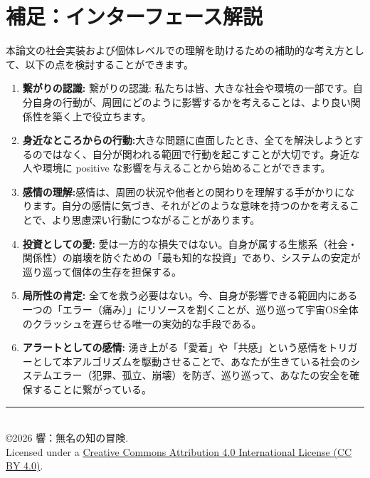 \documentclass[11pt,a4paper]{article}
\begin{document}
\section{補足：インターフェース解説}
本論文の社会実装および個体レベルでの理解を助けるための補助的な考え方として、以下の点を検討することができます。
\begin{enumerate}
    \item \textbf{繋がりの認識:} 繋がりの認識: 私たちは皆、大きな社会や環境の一部です。自分自身の行動が、周囲にどのように影響するかを考えることは、より良い関係性を築く上で役立ちます。
    \item \textbf{身近なところからの行動:}大きな問題に直面したとき、全てを解決しようとするのではなく、自分が関われる範囲で行動を起こすことが大切です。身近な人や環境に positive な影響を与えることから始めることができます。
    \item \textbf{感情の理解:}感情は、周囲の状況や他者との関わりを理解する手がかりになります。自分の感情に気づき、それがどのような意味を持つのかを考えることで、より思慮深い行動につながることがあります。
    \item \textbf{投資としての愛:} 愛は一方的な損失ではない。自身が属する生態系（社会・関係性）の崩壊を防ぐための「最も知的な投資」であり、システムの安定が巡り巡って個体の生存を担保する。
    \item \textbf{局所性の肯定:} 全てを救う必要はない。今、自身が影響できる範囲内にある一つの「エラー（痛み）」にリソースを割くことが、巡り巡って宇宙OS全体のクラッシュを遅らせる唯一の実効的な手段である。
    \item \textbf{アラートとしての感情:} 湧き上がる「愛着」や「共感」という感情をトリガーとして本アルゴリズムを駆動させることで、あなたが生きている社会のシステムエラー（犯罪、孤立、崩壊）を防ぎ、巡り巡って、あなたの安全を確保することに繋がっている。
\end{enumerate}

\vspace{20mm}

\begin{center}
    \vfill
    \rule{0.5\textwidth}{0.4pt} \\
    \medskip
    \copyright 2026 響：無名の知の冒険. \\
    Licensed under a \href{https://creativecommons.org}{Creative Commons Attribution 4.0 International License (CC BY 4.0)}.
\end{center}
\end{document}

